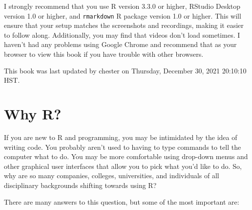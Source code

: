 \documentclass[]{tufte-book}
\begin{document}
I strongly recommend that you use R version 3.3.0 or higher, RStudio Desktop version 1.0 or higher, and \texttt{rmarkdown} R package version 1.0 or higher. This will ensure that your setup matches the screenshots and recordings, making it easier to follow along. Additionally, you may find that videos don't load sometimes. I haven't had any problems using Google Chrome and recommend that as your browser to view this book if you have trouble with other browsers.

This book was last updated by chester on Thursday, December 30, 2021 20:10:10 HST.

\hypertarget{whyR}{%
\chapter{Why R?}\label{whyR}}

If you are new to R and programming, you may be intimidated by the idea of writing code. You probably aren't used to having to type commands to tell the computer what to do. You may be more comfortable using drop-down menus and other graphical user interfaces that allow you to pick what you'd like to do. So, why are so many companies, colleges, universities, and individuals of all disciplinary backgrounds shifting towards using R?

There are many answers to this question, but some of the most important are:
\end{document}
